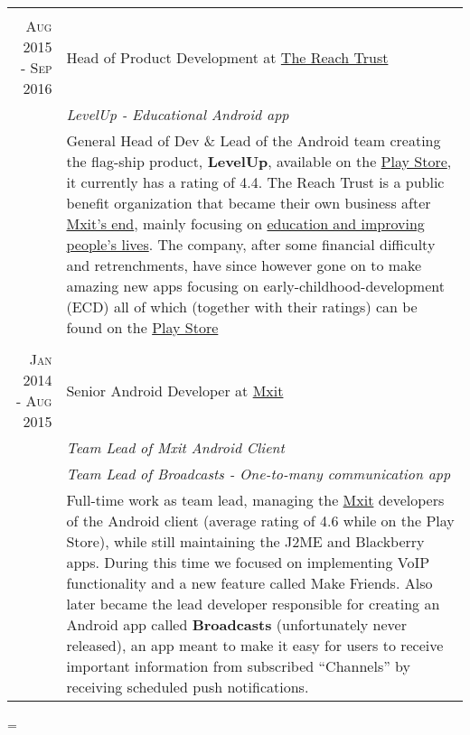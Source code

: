 \documentclass[a4paper,10pt,notitlepage]{article}
\newenvironment{absolutelynopagebreak}
  {\par\nobreak\vfil\penalty0\vfilneg
   \vtop\bgroup}
  {\par\xdef\tpd{\the\prevdepth}\egroup
   \prevdepth=\tpd}
\begin{document}
\begin{absolutelynopagebreak}
\begin{tabular}{r|p{11cm}}
		\multicolumn{2}{c}{} \\
		\textsc{Aug 2015 - Sep 2016} & Head of Product Development at \href{www.thereachtrust.org}{The Reach Trust} \\                                                                  &\emph{LevelUp -  Educational Android app} \\
		                            &\footnotesize{General Head of Dev \& Lead of the Android team creating the  flag-ship product, \textbf{LevelUp}, available on the \href{https://play.google.com/store/apps/details?id=org.mylevelup}{Play Store}, it currently has a rating of 4.4. The Reach Trust is a public benefit organization that became their own business after \href{https://memeburn.com/2015/10/mxit-confirms-its-shutting-up-shop/}{Mxit's end}, mainly focusing on \href{https://it-online.co.za/2015/10/26/reach-trust-will-use-mxit-for-education/}{education and improving people's lives}. The company, after some financial difficulty and retrenchments, have since however gone on to make amazing new apps focusing on early-childhood-development (ECD) all of which (together with their ratings) can be found on the \href{https://play.google.com/store/apps/dev?id=7356513661681471434}{Play Store}} \\
		 
		\multicolumn{2}{c}{} \\
		\textsc{Jan 2014 - Aug 2015} & Senior Android Developer at \href{www.mxit.com}{Mxit} \\
		                             & \emph{Team Lead of Mxit Android Client} \\
		                             & \emph{Team Lead of Broadcasts - One-to-many communication app} \\
		                             & \footnotesize{Full-time work as team lead, managing the \href{https://en.wikipedia.org/wiki/Mxit}{Mxit} developers of the Android client (average rating of 4.6 while on the Play Store), while still maintaining the J2ME and Blackberry apps. During this time we focused on implementing VoIP functionality and a new feature called Make Friends. Also later became the lead developer responsible for creating an Android app called \textbf{Broadcasts} (unfortunately never released), an app meant to make it easy for users to receive important information from subscribed ``Channels'' by receiving scheduled push notifications. } \\
		 

\end{tabular}
\end{absolutelynopagebreak}
\end{document}
